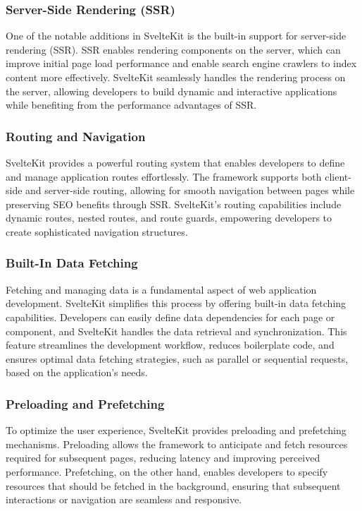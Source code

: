 \subsubsection{Server-Side Rendering (SSR)}

One of the notable additions in SvelteKit is the built-in support for server-side rendering (SSR). SSR enables rendering components on the server, which can improve initial page load performance and enable search engine crawlers to index content more effectively. SvelteKit seamlessly handles the rendering process on the server, allowing developers to build dynamic and interactive applications while benefiting from the performance advantages of SSR.

\subsubsection{Routing and Navigation}

SvelteKit provides a powerful routing system that enables developers to define and manage application routes effortlessly. The framework supports both client-side and server-side routing, allowing for smooth navigation between pages while preserving SEO benefits through SSR. SvelteKit's routing capabilities include dynamic routes, nested routes, and route guards, empowering developers to create sophisticated navigation structures.

\subsubsection{Built-In Data Fetching}

Fetching and managing data is a fundamental aspect of web application development. SvelteKit simplifies this process by offering built-in data fetching capabilities. Developers can easily define data dependencies for each page or component, and SvelteKit handles the data retrieval and synchronization. This feature streamlines the development workflow, reduces boilerplate code, and ensures optimal data fetching strategies, such as parallel or sequential requests, based on the application's needs.

\subsubsection{Preloading and Prefetching}

To optimize the user experience, SvelteKit provides preloading and prefetching mechanisms. Preloading allows the framework to anticipate and fetch resources required for subsequent pages, reducing latency and improving perceived performance. Prefetching, on the other hand, enables developers to specify resources that should be fetched in the background, ensuring that subsequent interactions or navigation are seamless and responsive.


